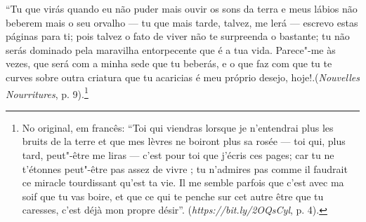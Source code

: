 ``Tu que virás quando eu não puder mais ouvir os sons da terra e meus
lábios não beberem mais o seu orvalho --- tu que mais tarde, talvez, me
lerá --- escrevo estas páginas para ti; pois talvez o fato de viver não te
surpreenda o bastante; tu não serás dominado pela maravilha entorpecente
que é a tua vida. Parece"-me às vezes, que será com a minha sede que tu
beberás, e o que faz com que tu te curves sobre outra criatura que tu
acaricias é meu próprio desejo, hoje!.(\emph{Nouvelles Nourritures}, p.
9).\footnote{No original, em francês: ``Toi qui viendras lorsque je
  n'entendrai plus les bruits de la terre et que mes lèvres ne boiront
  plus sa rosée --- toi qui, plus tard, peut"-être me liras --- c'est pour
  toi que j'écris ces pages; car tu ne t'étonnes peut"-être pas assez de
  vivre ; tu n'admires pas comme il faudrait ce miracle tourdissant
  qu'est ta vie. Il me semble parfois que c'est avec ma soif que tu vas
  boire, et que ce qui te penche sur cet autre être que tu caresses,
  c'est déjà mon propre désir''.
  (\emph{https://bit.ly/2OQsCyl}, p. 4). \versal{[N. T.]}}
